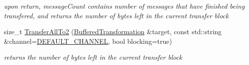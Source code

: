 \begin{DoxyCompactItemize}
\begin{DoxyCompactList}\small\item\em upon return, messageCount contains number of messages that have finished being transfered, and returns the number of bytes left in the current transfer block \item\end{DoxyCompactList}\item 
\hypertarget{class_buffered_transformation_a3e47718aa65674256e1b069ec8e706b7}{
size\_\-t \hyperlink{class_buffered_transformation_a3e47718aa65674256e1b069ec8e706b7}{TransferAllTo2} (\hyperlink{class_buffered_transformation}{BufferedTransformation} \&target, const std::string \&channel=\hyperlink{cryptlib_8h_a6f1917f54ea8c2a45de6e08c5087c8de}{DEFAULT\_\-CHANNEL}, bool blocking=true)}
\label{class_buffered_transformation_a3e47718aa65674256e1b069ec8e706b7}

\begin{DoxyCompactList}\small\item\em returns the number of bytes left in the current transfer block \item\end{DoxyCompactList}\end{DoxyCompactItemize}
